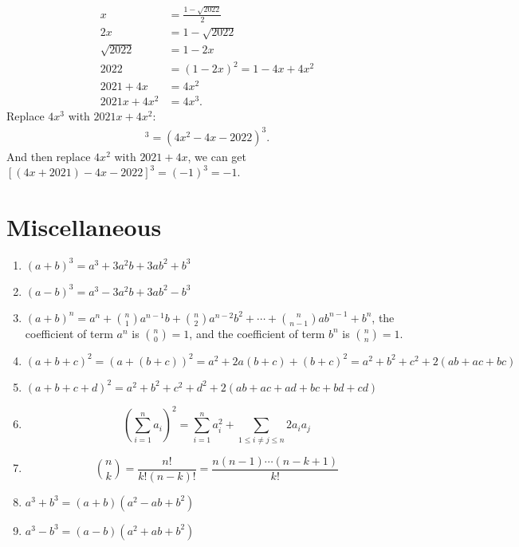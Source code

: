 \documentclass[11pt, oneside]{article}   	%
\begin{document}
\begin{enumerate}
\begin{align*}
x & =\frac{1-\sqrt{2022}}{2} \\
2x & = 1 - \sqrt{2022}\\
\sqrt{2022} & = 1 - 2x \\
2022 & = (1 - 2x)^2 = 1 - 4x + 4x^2\\
2021 + 4x & = 4x^2 \\
2021x + 4x^2 & = 4x^3. 
\end{align*}
Replace $4x^3$ with $2021x + 4x^2$: 
\begin{align*}
[(4x^2 + 2021x) - 2025x - 2022]^3 = (4x^2 - 4x -2022)^3. 
\end{align*}
And then replace $4x^2$ with $2021 + 4x$, we can get $[(4x + 2021) -4x -2022]^3 = (-1)^3 = -1$. 


\end{enumerate} 






\newpage 
\section{Miscellaneous} 
\begin{enumerate}
\item $(a+b)^3=a^3+3a^2b+3ab^2+b^3$ 
\item $(a-b)^3=a^3-3a^2b+3ab^2-b^3$ 
\item $(a+b)^n=a^n+\binom{n}{1}a^{n-1}b+\binom{n}{2}a^{n-2}b^2+\cdots+\binom{n}{n-1}ab^{n-1}+b^n$, the coefficient of term $a^n$ is $\binom{n}{0}=1$, and the coefficient of term $b^n$ is $\binom{n}{n}=1$. 
\item $(a+b+c)^2=(a+(b+c))^2=a^2+2a(b+c)+(b+c)^2=a^2+b^2+c^2+2(ab+ac+bc)$
\item $(a+b+c+d)^2=a^2+b^2+c^2+d^2+2(ab+ac+ad+bc+bd+cd)$
\item \[\left(\sum^n_{i=1} a_i\right)^2=\sum^n_{i=1} a_i^2+\sum_{1 \le i \ne j \le n} 2a_i a_j \]
\item \[\binom{n}{k}=\frac{n!}{k!(n-k)!}=\frac{n(n-1)\cdots(n-k+1)}{k!}\]
\item $a^3 + b^3 = (a+b) (a^2-ab+b^2)$ 
\item $a^3 - b^3 = (a-b) (a^2 + ab +b^2)$ 
\end{enumerate}







\end{document}
